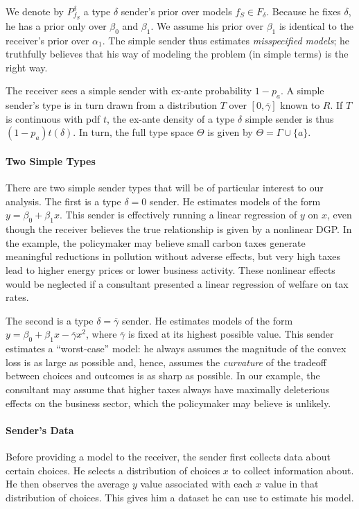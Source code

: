 \documentclass[11pt,dvipsnames]{article}
\begin{document}
We denote by $P_{f_S}^\delta$ a type $\delta$ sender's prior over models $f_S \in F_\delta$.
Because he fixes $\delta$, he has a prior only over $\beta_0$ and $\beta_1$.
We assume his prior over $\beta_1$ is identical to the receiver's prior over $\alpha_1$.
The simple sender thus estimates \emph{misspecified models}; he truthfully believes that his way of modeling the problem (in simple terms) is the right way.

The receiver sees a simple sender with ex-ante probability $1-p_a$.
A simple sender's type is in turn drawn from a distribution $T$ over $[0,\overline{\gamma}]$ known to $R$.
If $T$ is continuous with pdf $t$, the ex-ante density of a type $\delta$ simple sender is thus $(1-p_a)t(\delta)$.
In turn, the full type space $\Theta$ is given by $\Theta = \Gamma \cup \{a\}$.

\paragraph{Two Simple Types}
There are two simple sender types that will be of particular interest to our analysis.
The first is a type $\delta = 0$ sender. He estimates models of the form $y = \beta_0+\beta_1x$.
This sender is effectively running a linear regression of $y$ on $x$, even though the receiver believes the true relationship is given by a nonlinear DGP.
In the example, the policymaker may believe small carbon taxes generate meaningful reductions in pollution without adverse effects, but very high taxes lead to higher energy prices or lower business activity.
These nonlinear effects would be neglected if a consultant presented a linear regression of welfare on tax rates. 

The second is a type $\delta = \overline{\gamma}$ sender.
He estimates models of the form $y = \beta_0+\beta_1x-\overline{\gamma}x^2$, where $\overline{\gamma}$ is fixed at its highest possible value.
This sender estimates a ``worst-case'' model: he always assumes the magnitude of the convex loss is as large as possible and, hence, assumes the \emph{curvature} of the tradeoff between choices and outcomes is as sharp as possible.
In our example, the consultant may assume that higher taxes always have maximally deleterious effects on the business sector, which the policymaker may believe is unlikely.

\paragraph{Sender's Data}
Before providing a model to the receiver, the sender first collects data about certain choices.
He selects a distribution of choices $x$ to collect information about.
He then observes the average $y$ value associated with each $x$ value in that distribution of choices.
This gives him a dataset he can use to estimate his model.
\end{document}
